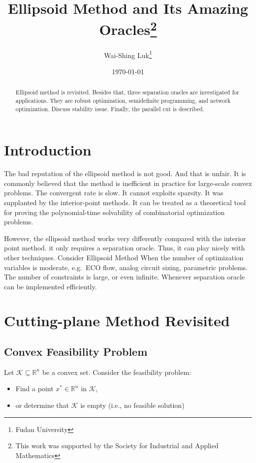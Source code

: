 \documentclass[]{article}
\title{Ellipsoid Method and Its Amazing Oracles\thanks{This work was supported by the Society for Industrial and Applied
Mathematics}}
\author{Wai-Shing Luk\thanks{Fudan University}}
\date{\today}
\providecommand{\tightlist}{%
  \setlength{\itemsep}{0pt}\setlength{\parskip}{0pt}}
\begin{document}
\maketitle
\begin{abstract}
Ellipsoid method is revisited. Besides that, three separation oracles
are investigated for applications. They are robust optimization,
semidefinite programming, and network optimization. Discuss stability
issue. Finally, the parallel cut is described.
\end{abstract}

\hypertarget{introduction}{%
\section{Introduction}\label{introduction}}

The bad reputation of the ellipsoid method is not good. And that is
unfair. It is commonly believed that the method is inefficient in
practice for large-scale convex problems. The convergent rate is slow.
It cannot exploits sparsity. It was supplanted by the interior-point
methods. It can be treated as a theoretical tool for proving the
polynomial-time solvability of combinatorial optimization problems.

However, the ellipsoid method works very differently compared with the
interior point method. it only requires a separation oracle. Thus, it
can play nicely with other techniques. Consider Ellipsoid Method When
the number of optimization variables is moderate, e.g.~ECO flow, analog
circuit sizing, parametric problems. The number of constraints is large,
or even infinite. Whenever separation oracle can be implemented
efficiently.

\hypertarget{cutting-plane-method-revisited}{%
\section{Cutting-plane Method
Revisited}\label{cutting-plane-method-revisited}}

\hypertarget{convex-feasibility-problem}{%
\subsection{Convex Feasibility
Problem}\label{convex-feasibility-problem}}

Let \(\mathcal{K} \subseteq \mathbb{R}^n\) be a convex set. Consider the
feasibility problem:

\begin{itemize}
\tightlist
\item
  Find a point \(x^* \in \mathbb{R}^n\) in \(\mathcal{K}\),
\item
  or determine that \(\mathcal{K}\) is empty (i.e., no feasible
  solution)
\end{itemize}
\end{document}
